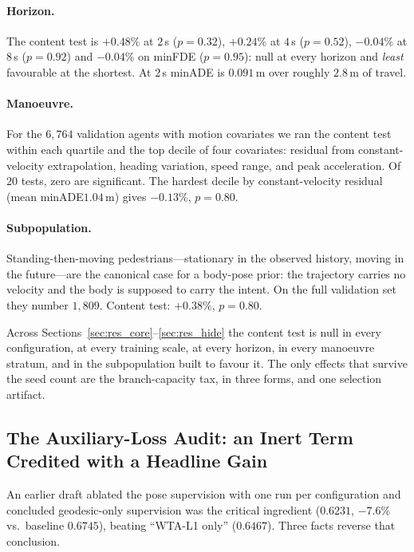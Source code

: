 \documentclass{article} %
\newcommand{\minADE}{minADE\xspace}
\newcommand{\minFDE}{minFDE\xspace}
\begin{document}
\paragraph{Horizon.}
The content test is $+0.48\%$ at $2$\,s ($p{=}0.32$), $+0.24\%$ at $4$\,s
($p{=}0.52$), $-0.04\%$ at $8$\,s ($p{=}0.92$) and $-0.04\%$ on \minFDE
($p{=}0.95$): null at every horizon and \emph{least} favourable at the shortest.
At $2$\,s \minADE is $0.091$\,m over roughly $2.8$\,m of travel.

\paragraph{Manoeuvre.}
For the $6{,}764$ validation agents with motion covariates we ran the content test
within each quartile and the top decile of four covariates: residual from
constant-velocity extrapolation, heading variation, speed range, and peak
acceleration. Of $20$ tests, zero are significant. The hardest decile by
constant-velocity residual (mean \minADE $1.04$\,m) gives $-0.13\%$, $p{=}0.80$.

\paragraph{Subpopulation.}
Standing-then-moving pedestrians---stationary in the observed history, moving in
the future---are the canonical case for a body-pose prior: the trajectory carries
no velocity and the body is supposed to carry the intent. On the full validation
set they number $1{,}809$. Content test: $+0.38\%$, $p{=}0.80$.

Across Sections~\ref{sec:res_core}--\ref{sec:res_hide} the content test is null in
every configuration, at every training scale, at every horizon, in every manoeuvre
stratum, and in the subpopulation built to favour it. The only effects that
survive the seed count are the branch-capacity tax, in three forms, and one
selection artifact.

\subsection{The Auxiliary-Loss Audit: an Inert Term Credited with a Headline Gain}
\label{sec:loss_ablation}

An earlier draft ablated the pose supervision with one run per configuration and
concluded geodesic-only supervision was the critical ingredient ($0.6231$,
$-7.6\%$ vs.\ baseline $0.6745$), beating ``WTA-L1 only'' ($0.6467$). Three facts
reverse that conclusion.
\end{document}
